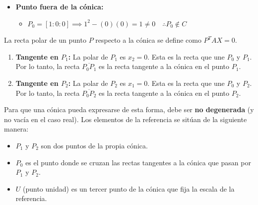 {\begin{itemize}
    \item \textbf{Punto fuera de la cónica:}
    \begin{itemize}
        \item $P_0 = [1 : 0 : 0] \implies 1^2 - (0)(0) = 1 \neq 0 \quad \therefore P_0 \notin C$
    \end{itemize}
\end{itemize}


La recta polar de un punto $P$ respecto a la cónica se define como $P^T A X = 0$.

\begin{enumerate}
    \item \textbf{Tangente en $P_1$:} La polar de $P_1$ es $x_2 = 0$. Esta es la recta que une $P_0$ y $P_1$. Por lo tanto, la recta $\overline{P_0P_1}$ es la recta tangente a la cónica en el punto $P_1$.
    \item \textbf{Tangente en $P_2$:} La polar de $P_2$ es $x_1 = 0$. Esta es la recta que une $P_0$ y $P_2$. Por lo tanto, la recta $\overline{P_0P_2}$ es la recta tangente a la cónica en el punto $P_2$.
\end{enumerate}


Para que una cónica pueda expresarse de esta forma, debe ser \textbf{no degenerada} (y no vacía en el caso real). Los elementos de la referencia se sitúan de la siguiente manera:
\begin{itemize}
    \item $P_1$ y $P_2$ son dos puntos de la propia cónica.
    \item $P_0$ es el punto donde se cruzan las rectas tangentes a la cónica que pasan por $P_1$ y $P_2$.
    \item $U$ (punto unidad) es un tercer punto de la cónica que fija la escala de la referencia.
\end{itemize}
}

